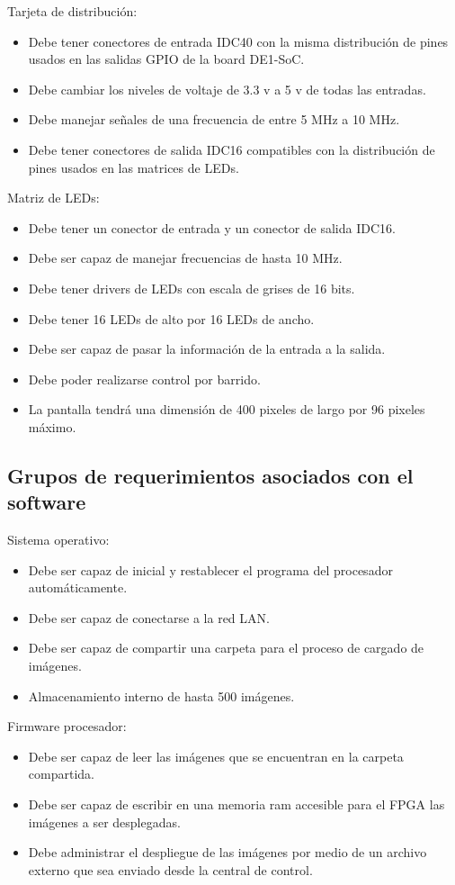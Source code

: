 Tarjeta de distribución:
\begin{itemize}
\item Debe tener conectores de entrada IDC40 con la misma distribución de pines usados en las salidas GPIO de la board DE1-SoC.
\item Debe cambiar los niveles de voltaje de 3.3 v a 5 v de todas las entradas. 
\item Debe manejar señales de una frecuencia de entre 5 MHz a 10 MHz.
\item Debe tener conectores de salida IDC16 compatibles con la distribución de pines usados en las matrices de LEDs.
\end{itemize}
Matriz de LEDs:
\begin{itemize}
\item Debe tener un conector de entrada y un conector de salida IDC16.
\item Debe ser capaz de manejar frecuencias de hasta 10 MHz.
\item Debe tener drivers de LEDs con escala de grises de 16 bits.
\item Debe tener 16 LEDs de alto por 16 LEDs de ancho.
\item Debe ser capaz de pasar la información de la entrada a la salida.
\item Debe poder realizarse control por barrido. 
\item La pantalla tendrá una dimensión de 400 pixeles de largo por 96 pixeles máximo.
\end{itemize}

\subsection{Grupos de requerimientos asociados con el software}

Sistema operativo:
\begin{itemize}
\item Debe ser capaz de inicial y restablecer el programa del procesador automáticamente.
\item Debe ser capaz de conectarse a la red LAN. 
\item Debe ser capaz de compartir una carpeta para el proceso de cargado de imágenes.
\item Almacenamiento interno de hasta 500 imágenes.
\end{itemize}

Firmware procesador:
\begin{itemize}
\item Debe ser capaz de leer las imágenes que se encuentran en la carpeta compartida.
\item Debe ser capaz de escribir en una  memoria ram accesible para el FPGA  las imágenes a ser desplegadas.
\item Debe administrar el despliegue de las imágenes por medio de un archivo externo que sea enviado desde la central de control.
\end{itemize}
